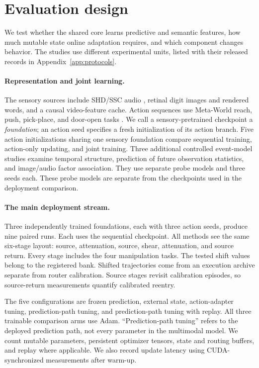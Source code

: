\section{Evaluation design}
\label{sec:evaluation}
We test whether the shared core learns predictive and semantic features,
how much mutable state online adaptation requires, and which component changes
behavior. The studies use different experimental units, listed with their
released records in Appendix~\ref{app:protocols}.

\paragraph{Representation and joint learning.}
The sensory sources include SHD/SSC audio \citep{cramer2022heidelberg}, retinal
digit images and rendered words, and a causal video-feature cache. Action
sequences use Meta-World reach, push, pick-place, and door-open tasks
\citep{yu2019metaworld}. We call a sensory-pretrained checkpoint a
\emph{foundation}; an action seed specifies a fresh initialization of its
action branch. Five action initializations sharing one sensory
foundation compare sequential training, action-only updating, and joint
training. Three additional controlled event-model studies examine temporal
structure, prediction of future observation statistics, and image/audio factor
association. They use separate probe models and three seeds each. These probe models are separate from the checkpoints used in the deployment
comparison.

\paragraph{The main deployment stream.}
Three independently trained foundations, each with three action seeds, produce
nine paired runs. Each uses the sequential checkpoint. All methods see the
same six-stage layout: source, attenuation, source, shear, attenuation, and
source return. Every stage includes the four manipulation tasks. The tested
shift values belong to the registered bank. Shifted trajectories come from an
execution archive separate from router calibration. Source stages revisit
calibration episodes, so source-return measurements quantify calibrated reentry.

The five configurations are frozen prediction, external state, action-adapter
tuning, prediction-path tuning, and prediction-path tuning with replay. All
three trainable comparison arms use Adam. ``Prediction-path tuning'' refers to
the deployed prediction path, not every parameter in the multimodal model.
We count mutable parameters, persistent optimizer tensors, state and routing
buffers, and replay where applicable. We also record update latency using
CUDA-synchronized measurements after warm-up.

